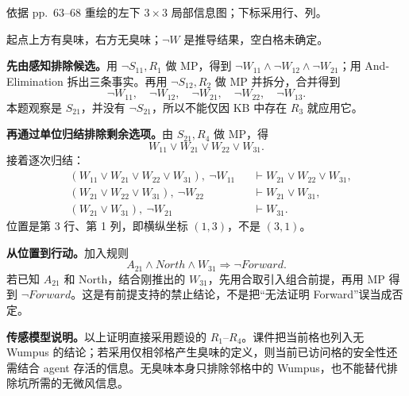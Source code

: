 \begin{center}


\small 依据 pp.~63--68 重绘的左下 $3\times3$ 局部信息图；下标采用行、列。\par
\small 起点上方有臭味，右方无臭味；$\neg W$ 是推导结果，空白格未确定。
\end{center}

\begin{workedsolution}
\textbf{先由感知排除候选。}用 $\neg S_{11},R_1$ 做 MP，得到 $\neg W_{11}\land\neg W_{12}\land\neg W_{21}$；用 And-Elimination 拆出三条事实。再用 $\neg S_{12},R_2$ 做 MP 并拆分，合并得到
\[
 \neg W_{11},\quad\neg W_{12},\quad\neg W_{21},\quad
 \neg W_{22},\quad\neg W_{13}.
\]
本题观察是 $S_{21}$，并没有 $\neg S_{21}$，所以不能仅因 KB 中存在 $R_3$ 就应用它。

\textbf{再通过单位归结排除剩余选项。}由 $S_{21},R_4$ 做 MP，得
\[
 W_{11}\lor W_{21}\lor W_{22}\lor W_{31}.
\]
接着逐次归结：
\begin{align*}
 &(W_{11}\lor W_{21}\lor W_{22}\lor W_{31}),\ \neg W_{11}
   &&\vdash W_{21}\lor W_{22}\lor W_{31},\\
 &(W_{21}\lor W_{22}\lor W_{31}),\ \neg W_{22}
   &&\vdash W_{21}\lor W_{31},\\
 &(W_{21}\lor W_{31}),\ \neg W_{21}
   &&\vdash\boxed{W_{31}}.
\end{align*}
位置是第 3 行、第 1 列，即横纵坐标 $(1,3)$，不是 $(3,1)$。

\textbf{从位置到行动。}加入规则
\[
 A_{21}\land North\land W_{31}\Rightarrow\neg Forward.
\]
若已知 $A_{21}$ 和 North，结合刚推出的 $W_{31}$，先用合取引入组合前提，再用 MP 得到 $\neg Forward$。这是有前提支持的禁止结论，不是把“无法证明 Forward”误当成否定。

\textbf{传感模型说明。}以上证明直接采用题设的 $R_1$--$R_4$。课件把当前格也列入无 Wumpus 的结论；若采用仅相邻格产生臭味的定义，则当前已访问格的安全性还需结合 agent 存活的信息。无臭味本身只排除邻格中的 Wumpus，也不能替代排除坑所需的无微风信息。
\end{workedsolution}
\endgroup
